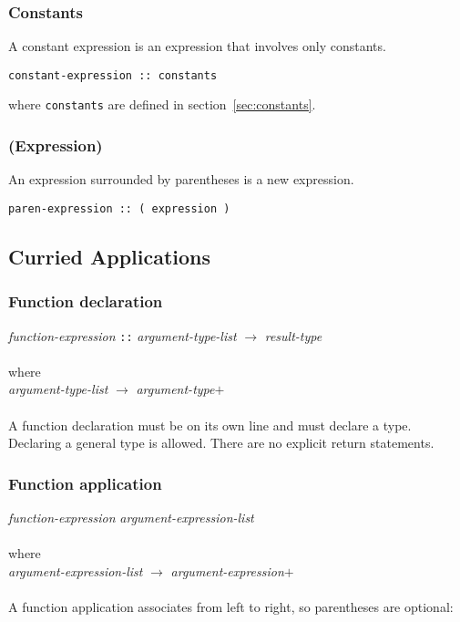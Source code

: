 \subsubsection{Constants}
A constant expression is an expression that involves only constants. 
\begin{verbatim}
constant-expression :: constants
\end{verbatim}
where \texttt{constants} are defined in section~\ref{sec:constants}.

\subsubsection{(Expression)}
An expression surrounded by parentheses is a new expression.
\begin{verbatim}
paren-expression :: ( expression )
\end{verbatim}


\subsection{Curried Applications}

    \subsubsection{Function declaration}
    \emph{function-expression} \texttt{::}  \emph{argument-type-list} \texttt{$\rightarrow$} \emph{result-type} \\ \\
    where\\
    
    \emph{argument-type-list} $\rightarrow$ \emph{argument-type}$+$ \\ \\
    A function declaration must be on its own line and must declare a type. Declaring a general type is allowed. There are no explicit return statements.
  
    \subsubsection{Function application}
    \emph{function-expression} \emph{argument-expression-list} \\ \\
    where\\
    
    \emph{argument-expression-list} $\rightarrow$ \emph{argument-expression}$+$ \\ \\ 
    A function application associates from left to right, so parentheses are optional: \\
    
